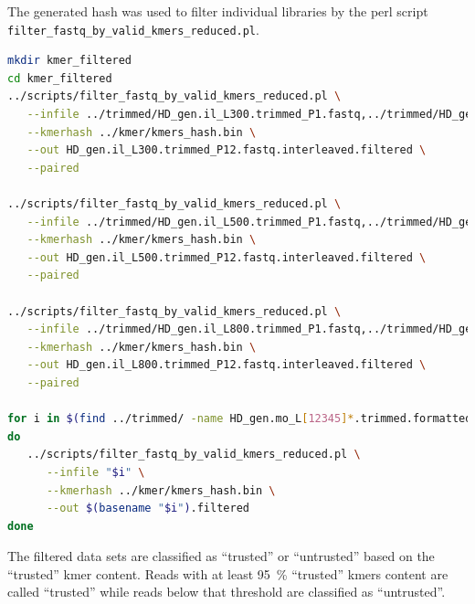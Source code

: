 \documentclass[12pt,a4paper]{scrartcl}
\begin{document}
The generated hash was used to filter individual libraries by the perl
script \texttt{filter\_fastq\_by\_valid\_kmers\_reduced.pl}.

\begin{lstlisting}[language=bash]
mkdir kmer_filtered
cd kmer_filtered
../scripts/filter_fastq_by_valid_kmers_reduced.pl \
   --infile ../trimmed/HD_gen.il_L300.trimmed_P1.fastq,../trimmed/HD_gen.il_L300.trimmed_P2.fastq \
   --kmerhash ../kmer/kmers_hash.bin \
   --out HD_gen.il_L300.trimmed_P12.fastq.interleaved.filtered \
   --paired

../scripts/filter_fastq_by_valid_kmers_reduced.pl \
   --infile ../trimmed/HD_gen.il_L500.trimmed_P1.fastq,../trimmed/HD_gen.il_L500.trimmed_P2.fastq \
   --kmerhash ../kmer/kmers_hash.bin \
   --out HD_gen.il_L500.trimmed_P12.fastq.interleaved.filtered \
   --paired

../scripts/filter_fastq_by_valid_kmers_reduced.pl \
   --infile ../trimmed/HD_gen.il_L800.trimmed_P1.fastq,../trimmed/HD_gen.il_L800.trimmed_P2.fastq \
   --kmerhash ../kmer/kmers_hash.bin \
   --out HD_gen.il_L800.trimmed_P12.fastq.interleaved.filtered \
   --paired

for i in $(find ../trimmed/ -name HD_gen.mo_L[12345]*.trimmed.formatted.fastq)
do
   ../scripts/filter_fastq_by_valid_kmers_reduced.pl \
      --infile "$i" \
      --kmerhash ../kmer/kmers_hash.bin \
      --out $(basename "$i").filtered
done
\end{lstlisting}

The filtered data sets are classified as ``trusted'' or ``untrusted''
based on the ``trusted'' kmer content. Reads with at least
\SI{95}{\percent} ``trusted'' kmers content are called ``trusted''
while reads below that threshold are classified as ``untrusted''.
\end{document}
